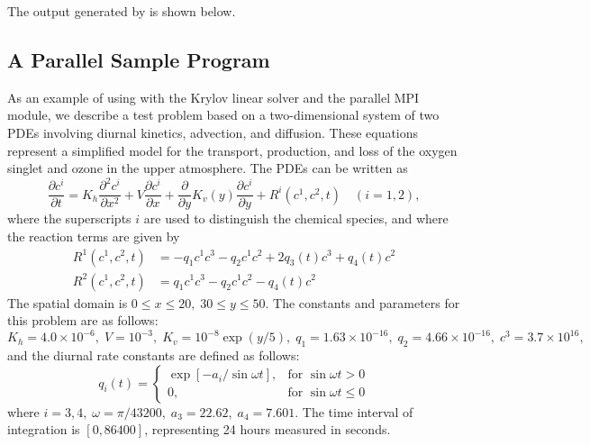 The output generated by  is shown below.


\subsection{A Parallel Sample Program}\label{ss:parallel_sim_ex}

As an example of using {\cvode} with the Krylov linear solver {\cvspgmr}
and the parallel MPI {\nvecp} module, we describe 
a test problem based on a two-dimensional system of two PDEs involving
diurnal kinetics, advection, and diffusion. 
These equations represent a simplified model for the transport, production,
and loss of the oxygen singlet and ozone in the upper atmosphere.
The PDEs can be written as 
\begin{equation}\label{e:pvkx:pde}
  \frac{\partial c^i}{\partial t}=K_h\frac{\partial^2 c^i}{\partial x^2}
  +V \frac{\partial c^i}{\partial x}
  + \frac{\partial} {\partial y} K_v(y) \frac{\partial c^i}{\partial y}
  + R^i(c^1,c^2,t) \quad (i=1,2),
\end{equation}
where the superscripts $i$ are used to distinguish the chemical species, and
where the reaction terms are given by 
\begin{equation}\label{e:pvkx:r}
\begin{split}
  R^1(c^1,c^2,t) & = -q_1c^1c^3-q_2c^1c^2+2q_3(t)c^3+q_4(t)c^2 \\
  R^2(c^1,c^2,t) & = q_1c^1c^3-q_2c^1c^2-q_4(t)c^2
\end{split}
\end{equation}
The spatial domain is $0 \leq x \leq 20,\;30 \leq y \leq 50$. The constants
and parameters for this problem are as follows: $K_h=4.0\times
10^{-6},\;V=10^{-3},\;K_v=10^{-8}\exp (y/5),\;q_1=1.63\times
10^{-16},\;q_2=4.66\times 10^{-16},\;c^3=3.7\times 10^{16},$ and the diurnal
rate constants are defined as follows: 
\begin{equation*}
q_i(t) = 
\begin{cases}
\exp [-a_i/\sin \omega t], & \mbox{for }\sin \omega t>0 \\
0, & \mbox{for }\sin \omega t\leq 0
\end{cases}
\end{equation*}
where $i=3,4,\;\omega =\pi /43200,\;a_3=22.62,\;a_4=7.601.$
The time interval of integration is $[0, 86400]$, representing 24
hours measured in seconds.


